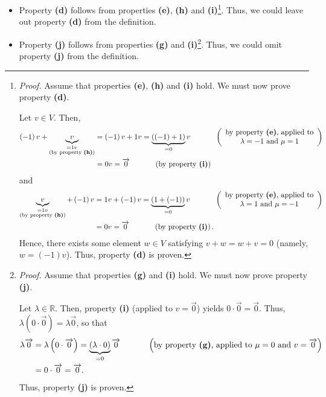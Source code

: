 \documentclass[numbers=enddot,12pt,final,onecolumn,notitlepage]{scrartcl}%
\theoremstyle{definition}
\begin{document}
\begin{itemize}
\item Property \textbf{(d)} follows from properties \textbf{(e)}, \textbf{(h)}
and \textbf{(i)}\footnote{\textit{Proof.} Assume that properties \textbf{(e)},
\textbf{(h)} and \textbf{(i)} hold. We must now prove property \textbf{(d)}.
\par
Let $v\in V$. Then,
\begin{align*}
\left(  -1\right)  v+\underbrace{v}_{\substack{=1v\\\text{(by property
\textbf{(h)})}}}  &  =\left(  -1\right)  v+1v=\underbrace{\left(  \left(
-1\right)  +1\right)  }_{=0}v\ \ \ \ \ \ \ \ \ \ \left(
\begin{array}
[c]{c}%
\text{by property \textbf{(e)}, applied to}\\
\lambda=-1\text{ and }\mu=1
\end{array}
\right) \\
&  =0v=\overrightarrow{0}\ \ \ \ \ \ \ \ \ \ \left(  \text{by property
\textbf{(i)}}\right)
\end{align*}
and%
\begin{align*}
\underbrace{v}_{\substack{=1v\\\text{(by property \textbf{(h)})}}}+\left(
-1\right)  v  &  =1v+\left(  -1\right)  v=\underbrace{\left(  1+\left(
-1\right)  \right)  }_{=0}v\ \ \ \ \ \ \ \ \ \ \left(
\begin{array}
[c]{c}%
\text{by property \textbf{(e)}, applied to}\\
\lambda=1\text{ and }\mu=-1
\end{array}
\right) \\
&  =0v=\overrightarrow{0}\ \ \ \ \ \ \ \ \ \ \left(  \text{by property
\textbf{(i)}}\right)  .
\end{align*}
Hence, there exists some element $w\in V$ satisfying $v+w=w+v=0$ (namely,
$w=\left(  -1\right)  v$). Thus, property \textbf{(d)} is proven.}. Thus, we
could leave out property \textbf{(d)} from the definition.

\item Property \textbf{(j)} follows from properties \textbf{(g)} and
\textbf{(i)}\footnote{\textit{Proof.} Assume that properties \textbf{(g)} and
\textbf{(i)} hold. We must now prove property \textbf{(j)}.
\par
Let $\lambda\in\mathbb{R}$. Then, property \textbf{(i)} (applied to
$v=\overrightarrow{0}$) yields $0\cdot\overrightarrow{0}=\overrightarrow{0}$.
Thus, $\lambda\left(  0\cdot\overrightarrow{0}\right)  =\lambda
\overrightarrow{0}$, so that%
\begin{align*}
\lambda\overrightarrow{0}  &  =\lambda\left(  0\cdot\overrightarrow{0}\right)
=\underbrace{\left(  \lambda\cdot0\right)  }_{=0}\overrightarrow{0}%
\ \ \ \ \ \ \ \ \ \ \left(  \text{by property \textbf{(g)}, applied to }%
\mu=0\text{ and }v=\overrightarrow{0}\right) \\
&  =0\cdot\overrightarrow{0}=\overrightarrow{0}.
\end{align*}
Thus, property \textbf{(j)} is proven.}. Thus, we could omit property
\textbf{(j)} from the definition.


\end{itemize}
\end{document}
